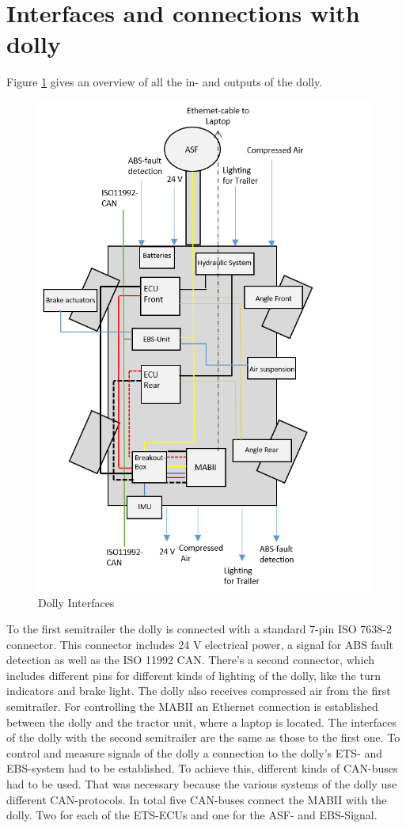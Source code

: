 \documentclass[ExampleMasters.tex]{subfiles}
\begin{document}
\section{Interfaces and connections with dolly}
\label{sec:interface_with_dolly}
Figure \ref{fig:dolly_interfaces} gives an overview of all the in- and outputs of the dolly.
\begin{figure}[h]
	\centering
	\includegraphics[width=0.5\linewidth]{figures/ExampleCover}
	\caption{Dolly Interfaces}
	\label{fig:dolly_interfaces}
\end{figure}
To the first semitrailer the dolly is connected with a standard 7-pin ISO 7638-2 connector. This connector includes 24 V electrical power, a signal for ABS fault detection as well as the ISO 11992 CAN.
There's a second connector, which includes different pins for different kinds of lighting of the dolly, like the turn indicators and brake light.
The dolly also receives compressed air from the first semitrailer.
For controlling the MABII an Ethernet connection is established between the dolly and the tractor unit, where a laptop is located. 
The interfaces of the dolly with the second semitrailer are the same as those to the first one.  
To control and measure signals of the dolly a connection to the dolly's ETS- and EBS-system had to be established. To achieve this, different kinds of CAN-buses had to be used. That was necessary because the various systems of the dolly use different CAN-protocols. In total five CAN-buses connect the MABII with the dolly. Two for each of the ETS-ECUs and one for the ASF- and EBS-Signal.
\end{document}
